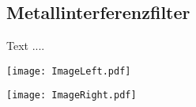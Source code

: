 \documentclass[12pt,a4paper,twoside]{article}
\begin{document}
\subsection{Metallinterferenzfilter}

Text ....\\

\begin{center}
	\centering
	\captionsetup{type=figure}
	\begin{minipage}{0.45 \linewidth}
		\texttt{[image: ImageLeft.pdf]}
	\end{minipage}
	\begin{minipage}{0.45 \linewidth}
		\texttt{[image: ImageRight.pdf]}
	\end{minipage}
	\label{fig:figlabel}
\end{center}

\newpage
\printbibliography
\end{document}
